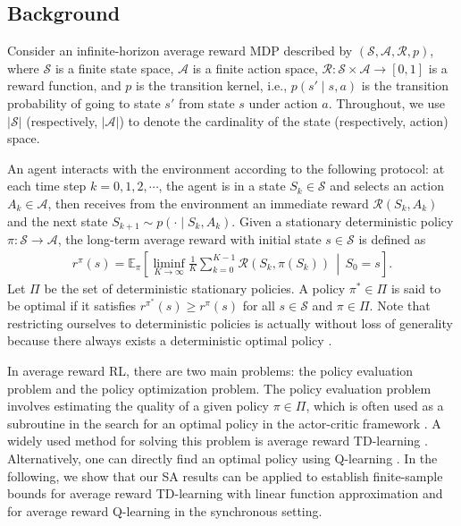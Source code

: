 \documentclass[11 pt]{article}
\begin{document}
	
	\subsection{Background}
	Consider an infinite-horizon average reward MDP described by $(\mathcal{S}, \mathcal{A}, \mathcal{R}, p)$, where $\mathcal{S}$ is a finite state space, $\mathcal{A}$ is a finite action space, $\mathcal{R}: \mathcal{S}\times \mathcal{A} \rightarrow [0, 1]$ is a reward function, and $p$ is the transition kernel, i.e., $p(s'\mid s,a)$ is the transition probability of going to state $s'$ from state $s$ under action $a$. Throughout, we use $|\mathcal{S}|$ (respectively, $|\mathcal{A}|$) to denote the cardinality of the state (respectively, action) space. 
	
	An agent interacts with the environment according to the following protocol: at each time step $k=0,1,2,\cdots$, the agent is in a state $S_k \in \mathcal{S}$ and selects an action $A_k \in \mathcal{A}$, then receives from the environment an immediate reward $\mathcal{R}(S_k, A_k)$ and the next state $S_{k+1}\sim p(\cdot\mid  S_k, A_k)$. Given a stationary deterministic policy $\pi:\mathcal{S}\to\mathcal{A}$, the long-term average reward with initial state $s \in \mathcal{S}$ is defined as
	\begin{align}\label{average reward}
		r^{\pi}(s) = \mathbb{E}_\pi\left[ \liminf_{K \rightarrow \infty} \frac{1}{K}\sum^{K-1}_{k=0} \mathcal{R}(S_k, \pi(S_k)) \,\middle|\, S_0=s \right].
	\end{align}
	Let $\Pi$ be the set of deterministic stationary policies. A policy $\pi^* \in \Pi$ is said to be optimal if it satisfies $r^{\pi^*}(s) \geq  r^\pi(s)$ for all $s\in \mathcal{S}$ and $\pi\in \Pi$. Note that restricting ourselves to deterministic policies is actually without loss of generality because there always exists a deterministic optimal policy \cite{puterman2014markov}.
	
	
	
	In average reward RL, there are two main problems: the policy evaluation problem and the policy optimization problem. The policy evaluation problem involves estimating the quality of a given policy $\pi \in \Pi$, which is often used as a subroutine in the search for an optimal policy in the actor-critic framework \cite{ganesh2024accelerated,li2024stochastic}. A widely used method for solving this problem is average reward TD-learning \cite{tsitsiklis1999average}. Alternatively, one can directly find an optimal policy using Q-learning \cite{mahadevan1996average}. In the following, we show that our SA results can be applied to establish finite-sample bounds for average reward TD-learning with linear function approximation and for average reward Q-learning in the synchronous setting.
	
\end{document}
